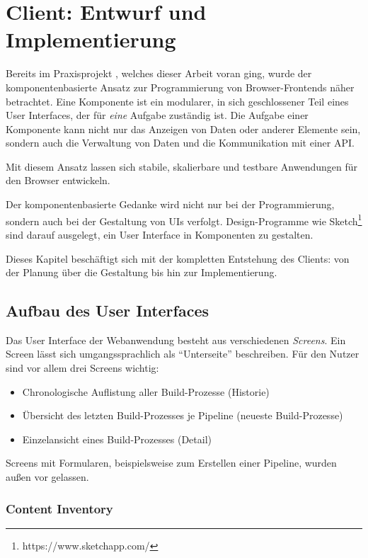 \section{Client: Entwurf und Implementierung}

Bereits im Praxisprojekt \citep{Maemecke2017}, welches dieser Arbeit voran ging, wurde der komponentenbasierte Ansatz zur Programmierung von Browser-Frontends näher betrachtet. Eine Komponente ist ein modularer, in sich geschlossener Teil eines User Interfaces, der für \emph{eine} Aufgabe zuständig ist. Die Aufgabe einer Komponente kann nicht nur das Anzeigen von Daten oder anderer Elemente sein, sondern auch die Verwaltung von Daten und die Kommunikation mit einer API.

Mit diesem Ansatz lassen sich stabile, skalierbare und testbare Anwendungen für den Browser entwickeln.

Der komponentenbasierte Gedanke wird nicht nur bei der Programmierung, sondern auch bei der Gestaltung von \acp{UI} verfolgt. Design-Programme wie Sketch\footnote{https://www.sketchapp.com/} sind darauf ausgelegt, ein User Interface in Komponenten zu gestalten.

Dieses Kapitel beschäftigt sich mit der kompletten Entstehung des Clients: von der Planung über die Gestaltung bis hin zur Implementierung.

\subsection{Aufbau des User Interfaces}
\label{subsec:entwurf-user-interface}

Das User Interface der Webanwendung besteht aus verschiedenen \emph{Screens}. Ein Screen lässt sich umgangssprachlich als ``Unterseite'' beschreiben. Für den Nutzer sind vor allem drei Screens wichtig:

\begin{itemize}
  \item Chronologische Auflistung aller Build-Prozesse (Historie)
  \item Übersicht des letzten Build-Prozesses je Pipeline (neueste Build-Prozesse)
  \item Einzelansicht eines Build-Prozesses (Detail)
\end{itemize}

Screens mit Formularen, beispielsweise zum Erstellen einer Pipeline, wurden außen vor gelassen.

\subsubsection{Content Inventory}

